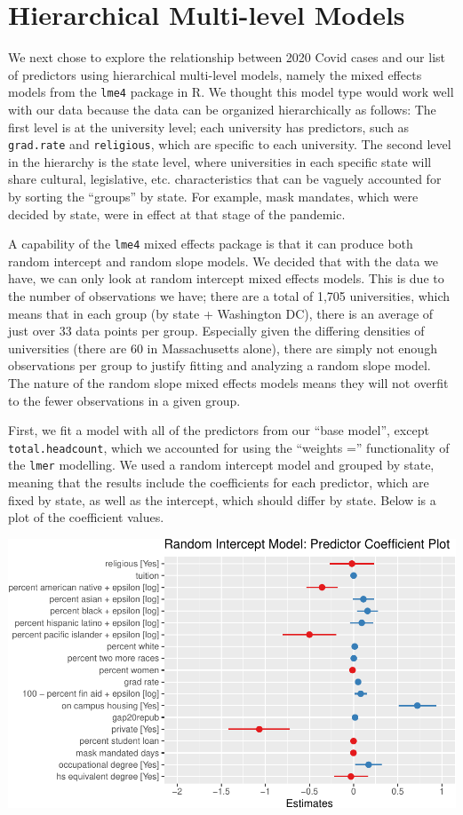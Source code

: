 \documentclass[
]{article}
\begin{document}
\hypertarget{hierarchical-multi-level-models}{%
\section{Hierarchical Multi-level
Models}\label{hierarchical-multi-level-models}}

We next chose to explore the relationship between 2020 Covid cases and
our list of predictors using hierarchical multi-level models, namely the
mixed effects models from the \texttt{lme4} package in R. We thought
this model type would work well with our data because the data can be
organized hierarchically as follows: The first level is at the
university level; each university has predictors, such as
\texttt{grad.rate} and \texttt{religious}, which are specific to each
university. The second level in the hierarchy is the state level, where
universities in each specific state will share cultural, legislative,
etc. characteristics that can be vaguely accounted for by sorting the
``groups'' by state. For example, mask mandates, which were decided by
state, were in effect at that stage of the pandemic.

A capability of the \texttt{lme4} mixed effects package is that it can
produce both random intercept and random slope models. We decided that
with the data we have, we can only look at random intercept mixed
effects models. This is due to the number of observations we have; there
are a total of 1,705 universities, which means that in each group (by
state + Washington DC), there is an average of just over 33 data points
per group. Especially given the differing densities of universities
(there are 60 in Massachusetts alone), there are simply not enough
observations per group to justify fitting and analyzing a random slope
model. The nature of the random slope mixed effects models means they
will not overfit to the fewer observations in a given group.

First, we fit a model with all of the predictors from our ``base
model'', except \texttt{total.headcount}, which we accounted for using
the ``weights ='' functionality of the \texttt{lmer} modelling. We used
a random intercept model and grouped by state, meaning that the results
include the coefficients for each predictor, which are fixed by state,
as well as the intercept, which should differ by state. Below is a plot
of the coefficient values.

\includegraphics{final_files/figure-latex/unnamed-chunk-35-1.pdf}
\end{document}
